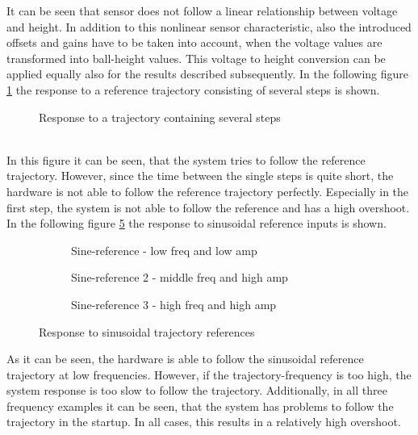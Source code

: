 It can be seen that sensor does not follow a linear relationship between voltage and height. In addition to this nonlinear sensor characteristic, also the introduced offsets and gains have to be taken into account, when the voltage values are transformed into ball-height values. 
This voltage to height conversion can be applied equally also for the results described subsequently.  
In the following figure \ref{fig:04} the response to a reference trajectory consisting of several steps is shown. 
\begin{figure}[!h]
        \centering
        
        \caption{Response to a trajectory containing several steps}
        \label{fig:04}
\end{figure}
\\In this figure it can be seen, that the system tries to follow the reference trajectory. However, since the time between the single steps is quite short, the hardware is not able to follow the reference trajectory perfectly. Especially in the first step, the system is not able to follow the reference and has a high overshoot. 
In the following figure \ref{fig:sine} the response to sinusoidal reference inputs is shown.

\begin{figure}[!h]
\centering
    \begin{subfigure}{.5\textwidth}
      \centering
      
      \caption{Sine-reference - low freq and low amp}
      \label{fig:06}
    \end{subfigure}%
    \begin{subfigure}{.5\textwidth}
      \centering
      
      \caption{Sine-reference 2 - middle freq and high amp}
      \label{fig:06}
    \end{subfigure}
    \begin{subfigure}{.5\textwidth}
      \centering
      
      \caption{Sine-reference 3 - high freq and high amp}
      \label{fig:06}
    \end{subfigure}    
    \caption{Response to sinusoidal trajectory references}
    \label{fig:sine}
\end{figure}
As it can be seen, the hardware is able to follow the sinusoidal reference trajectory at low frequencies. However, if the trajectory-frequency is too high, the system response is too slow to follow the trajectory. Additionally, in all three frequency examples it can be seen, that the system has problems to follow the trajectory in the startup. In all cases, this results in a relatively high overshoot.  